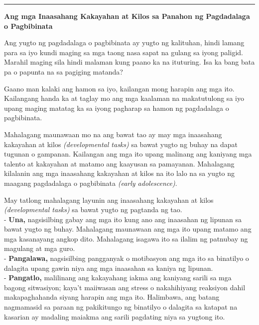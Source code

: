 \documentclass[10pt,a4paper]{article}
\newcommand{\SepRule}{\noindent							 %
						\begin{center}
							\rule{250pt}{1pt}
						\end{center}
						}
\newcommand{\NewsItem}[1]{%
		\usefont{T1}{augie}{m}{n} 	
		\large #1 \vspace{4pt}
		\par \normalsize \normalfont}
\begin{document}
\vspace{0.5cm}
	\SepRule
\vspace{0.5cm}
\begin{multicols*}{3}
	\NewsItem{\textbf{Ang mga Inaasahang Kakayahan at Kilos sa Panahon ng Pagdadalaga o Pagbibinata}}
		Ang yugto ng pagdadalaga o pagbibinata ay yugto ng kalituhan, hindi lamang para sa iyo kundi maging sa mga taong nasa sapat na gulang sa iyong paligid. Marahil maging sila hindi malaman kung paano ka na ituturing. Isa ka bang bata pa o papunta na sa pagiging matanda?
		
		Gaano man kalaki ang hamon sa iyo, kailangan mong harapin ang mga ito. Kailangang handa ka at taglay mo ang mga kaalaman na makatutulong sa iyo upang maging matatag ka sa iyong pagharap sa hamon ng pagdadalaga o pagbibinata.
		
		Mahalagang maunawaan mo na ang bawat tao ay may mga inaasahang kakayahan at kilos \textit{(developmental tasks)} sa bawat yugto ng buhay na dapat tugunan o gampanan. Kailangan ang mga ito upang malinang ang kaniyang mga talento at kakayahan at matamo ang kaayusan sa pamayanan. Mahalagang kilalanin ang mga inaasahang kakayahan at kilos na ito lalo na sa yugto ng maagang pagdadalaga o pagbibinata \textit{(early adolescence)}.
        
        May tatlong mahalagang layunin ang inaasahang kakayahan at kilos \textit{(developmental tasks)} sa bawat yugto ng pagtanda ng tao.\\
        - \textbf{Una,} nagsisilbing gabay ang mga ito kung ano ang inaasahan ng lipunan sa bawat yugto ng buhay. Mahalagang maunawaan ang mga ito upang matamo ang mga kasanayang angkop dito. Mahalagang isagawa ito sa ilalim ng patnubay ng magulang at mga guro.\\
        - \textbf{Pangalawa,} nagsisilbing pangganyak o motibasyon ang mga ito sa binatilyo o dalagita upang gawin niya ang mga inaasahan sa kaniya ng lipunan.\\
        - \textbf{Pangatlo,} malilinang ang kakayahang iakma ang kaniyang sarili sa mga bagong sitwasiyon; kaya't maiiwasan ang stress o nakahihiyang reaksiyon dahil makapaghahanda siyang harapin ang mga ito. Halimbawa, ang batang nagmamasid sa paraan ng pakikitungo ng binatilyo o dalagita sa katapat na kasarian ay madaling maiakma ang sarili pagdating niya sa yugtong ito.
\vspace{1cm}


\end{multicols*}
\end{document}
